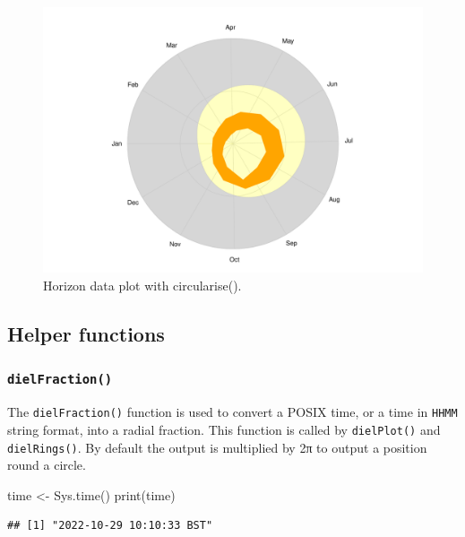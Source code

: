 \documentclass[
]{book}
\newenvironment{Shaded}{\begin{snugshade}}{\end{snugshade}}
\newcommand{\FunctionTok}[1]{\textcolor[rgb]{0.00,0.00,0.00}{#1}}
\newcommand{\NormalTok}[1]{#1}
\newcommand{\OtherTok}[1]{\textcolor[rgb]{0.56,0.35,0.01}{#1}}
\begin{document}
\begin{figure}

{\centering \includegraphics[width=0.9\linewidth]{_main_files/figure-latex/lyme-temp-2-1} 

}

\caption{Horizon data plot with circularise().}\label{fig:lyme-temp-2}
\end{figure}

\hypertarget{helper-functions}{%
\subsection{Helper functions}\label{helper-functions}}

\hypertarget{dielfraction}{%
\subsubsection{\texorpdfstring{\texttt{dielFraction()}}{dielFraction()}}\label{dielfraction}}

The \texttt{dielFraction()} function is used to convert a POSIX time, or a time in \texttt{HHMM} string format, into a radial fraction. This function is called by \texttt{dielPlot()} and \texttt{dielRings()}. By default the output is multiplied by 2π to output a position round a circle.

\begin{Shaded}
\begin{Highlighting}[]
\NormalTok{time }\OtherTok{\textless{}{-}} \FunctionTok{Sys.time}\NormalTok{()}
\FunctionTok{print}\NormalTok{(time)}
\end{Highlighting}
\end{Shaded}

\begin{verbatim}
## [1] "2022-10-29 10:10:33 BST"
\end{verbatim}
\end{document}
